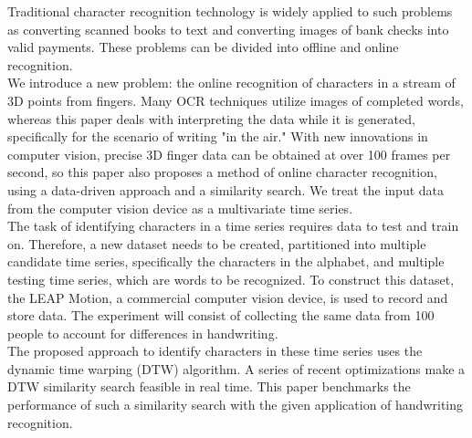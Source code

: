 Traditional character recognition technology is widely applied to such problems as converting scanned books to text and converting images of bank checks into valid payments. These problems can be divided into offline and online recognition.\\
We introduce a new problem: the online recognition of characters in a stream of 3D points from fingers. Many OCR techniques utilize images of completed words, whereas this paper deals with interpreting the data while it is generated, specifically for the scenario of writing "in the air."  
With new innovations in computer vision, precise 3D finger data can be obtained at over 100 frames per second, so this paper also proposes a method of online character recognition, using a data-driven approach and a similarity search. We treat the input data from the computer vision device as a multivariate time series.\\
The task of identifying characters in a time series requires data to test and train on. Therefore, a new dataset needs to be created, partitioned into multiple candidate time series, specifically the characters in the alphabet, and multiple testing time series, which are words to be recognized. To construct this dataset, the LEAP Motion, a commercial computer vision device, is used to record and store data. The experiment will consist of collecting the same data from 100 people to account for differences in handwriting.\\
The proposed approach to identify characters in these time series uses the dynamic time warping (DTW) algorithm. A series of recent optimizations make a DTW similarity search feasible in real time. This paper benchmarks the performance of such a similarity search with the given application of handwriting recognition.\\
